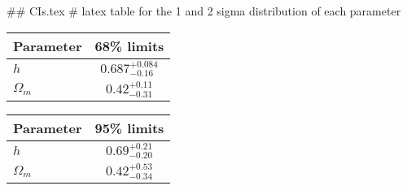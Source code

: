 ## CIs.tex
# latex table for the 1 and 2 sigma distribution of each parameter

\begin{tabular} { l  c}
 Parameter &  68\% limits\\
\hline
{\boldmath$h              $} & $0.687^{+0.084}_{-0.16}    $\\
{\boldmath$\Omega_m       $} & $0.42^{+0.11}_{-0.31}      $\\
\hline
\end{tabular}

\begin{tabular} { l  c}
 Parameter &  95\% limits\\
\hline
{\boldmath$h              $} & $0.69^{+0.21}_{-0.20}      $\\
{\boldmath$\Omega_m       $} & $0.42^{+0.53}_{-0.34}      $\\
\hline
\end{tabular}
